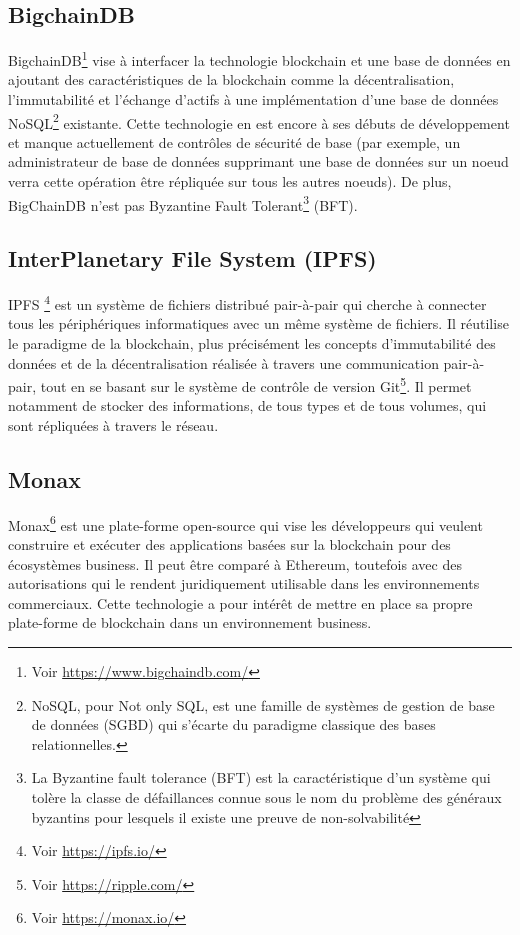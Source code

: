 \documentclass{tnreport}
\begin{document}
\subsection{BigchainDB}

BigchainDB\footnote{Voir \url{https://www.bigchaindb.com/}} vise à interfacer la technologie blockchain et une base de données en ajoutant des caractéristiques de la blockchain comme la décentralisation, l'immutabilité et l'échange d'actifs à une implémentation d'une base de données NoSQL\footnote{NoSQL, pour Not only SQL, est une famille de systèmes de gestion de base de données (SGBD) qui s'écarte du paradigme classique des bases relationnelles.} existante. Cette technologie en est encore à ses débuts de développement et manque actuellement de contrôles de sécurité de base (par exemple, un administrateur de base de données supprimant une base de données sur un noeud verra cette opération être répliquée sur tous les autres noeuds). De plus, BigChainDB n'est pas Byzantine Fault Tolerant\footnote{	La Byzantine fault tolerance (BFT) est la caractéristique d'un système qui tolère la classe de défaillances connue sous le nom du problème des généraux byzantins pour lesquels il existe une preuve de non-solvabilité} (BFT).

\subsection{InterPlanetary File System (IPFS)}

IPFS \footnote{Voir \url{https://ipfs.io/}} est un système de fichiers distribué pair-à-pair qui cherche à connecter tous les périphériques informatiques avec un même système de fichiers. Il réutilise le paradigme de la blockchain, plus précisément les concepts d'immutabilité des données et de la décentralisation réalisée à travers une communication pair-à-pair, tout en se basant sur le système de contrôle de version Git\footnote{Voir \url{https://ripple.com/}}. Il permet notamment de stocker des informations, de tous types et de tous volumes, qui sont répliquées à travers le réseau. 

\subsection{Monax}

Monax\footnote{Voir \url{https://monax.io/}} est une plate-forme open-source qui vise les développeurs qui veulent construire et exécuter des applications basées sur la blockchain pour des écosystèmes business. Il peut être comparé à Ethereum, toutefois avec des autorisations qui le rendent juridiquement utilisable dans les environnements commerciaux. Cette technologie a pour intérêt de mettre en place sa propre plate-forme de blockchain dans un environnement business.
\end{document}

